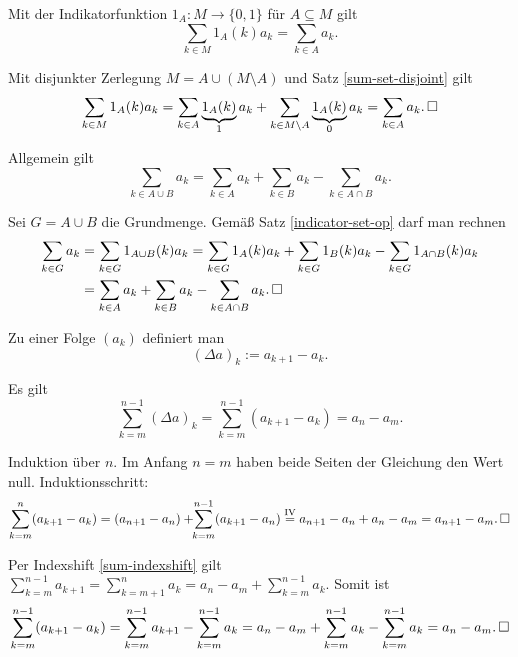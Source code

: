 \begin{Satz} Mit der Indikatorfunktion $1_A\colon M\to\{0,1\}$
für $A\subseteq M$ gilt
\[\sum_{k\in M} 1_A(k)a_k = \sum_{k\in A} a_k.\]
\end{Satz}
\begin{Beweis}
Mit disjunkter Zerlegung $M=A\cup (M\setminus A)$
und Satz \ref{sum-set-disjoint} gilt
\[\sum_{k\in M} 1_A(k)a_k = \sum_{k\in A} \underbrace{1_A(k)}_{1} a_k
+ \sum_{k\in M\setminus A}\underbrace{1_A(k)}_{0} a_k
= \sum_{k\in A} a_k.\,\square\]
\end{Beweis}

\begin{Satz} Allgemein gilt
\[\sum_{k\in A\cup B} a_k = \sum_{k\in A} a_k + \sum_{k\in B} a_k
- \sum_{k\in A\cap B} a_k.\]
\end{Satz}
\begin{Beweis} Sei $G=A\cup B$ die Grundmenge. Gemäß Satz
\ref{indicator-set-op} darf man rechnen
\begin{align*}
\sum_{k\in G} a_k &= \sum_{k\in G} 1_{A\cup B}(k)a_k
= \sum_{k\in G} 1_A(k)a_k + \sum_{k\in G} 1_B(k)a_k
- \sum_{k\in G} 1_{A\cap B}(k)a_k\\
&= \sum_{k\in A} a_k + \sum_{k\in B} a_k - \sum_{k\in A\cap B} a_k.\,\square
\end{align*}
\end{Beweis}

\begin{Definition}[Differenzenfolge]
Zu einer Folge $(a_k)$ definiert man
\[(\Delta a)_k := a_{k+1} - a_k.\]
\end{Definition}

\begin{Satz}[Teleskopsumme]\label{sum-tele} Es gilt
\[\sum_{k=m}^{n-1} (\Delta a)_k = \sum_{k=m}^{n-1} (a_{k+1} - a_k) = a_n - a_m.\]
\end{Satz}
\begin{Beweis}[Beweis 1] Induktion über $n$. Im Anfang $n=m$ haben beide Seiten
der Gleichung den Wert null. Induktionsschritt:
\[\sum_{k=m}^n (a_{k+1} - a_k) = (a_{n+1} - a_n) + \!\!\sum_{k=m}^{n-1} (a_{k+1} - a_n)
\stackrel{\mathrm{IV}}= a_{n+1} - a_n + a_n - a_m = a_{n+1} - a_m.\,\square\]
\end{Beweis}
\begin{Beweis}[Beweis 2]
Per Indexshift \ref{sum-indexshift}
gilt $\sum\limits_{k=m}^{n-1} a_{k+1} = \!\!\sum\limits_{k=m+1}^n\!\! a_k
= a_n - a_m + \sum\limits_{k=m}^{n-1} a_k$.
Somit ist%
\[\sum_{k=m}^{n-1} (a_{k+1} - a_k) = \sum_{k=m}^{n-1} a_{k+1} - \sum_{k=m}^{n-1} a_k
= a_n - a_m + \sum_{k=m}^{n-1} a_k - \sum_{k=m}^{n-1} a_k = a_n - a_m.\,\square\]
\end{Beweis}

